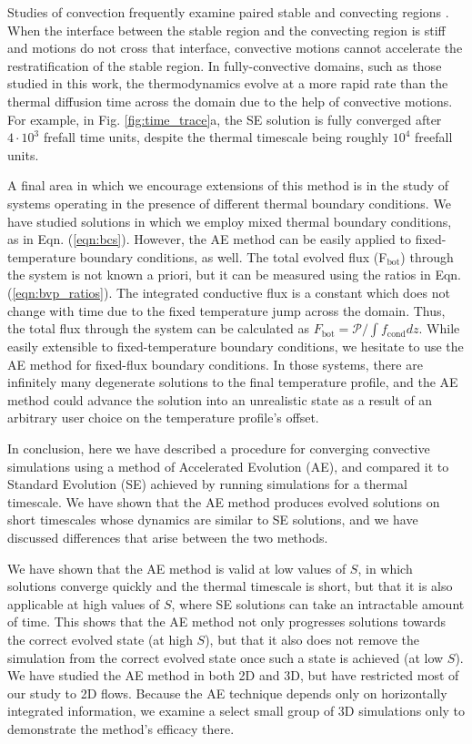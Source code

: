 \documentclass[aps, pre, onecolumn, nofootinbib, notitlepage, groupedaddress, amsfonts, amssymb, amsmath, longbibliography]{revtex4-1}
\begin{document}
Studies of convection frequently examine paired stable and convecting regions
\cite{hurlburt&all1986, brandenburg&all2005, couston&all2017}.
When the interface between the stable region
and the convecting region is stiff and motions do not cross that interface,
convective motions cannot accelerate the restratification of the stable region.
In fully-convective domains, such as those studied in this work, the thermodynamics evolve
at a more rapid rate than the thermal diffusion time across the domain due to
the help of convective motions.  For example, in Fig. \ref{fig:time_trace}a,
the SE solution is fully converged after $4\cdot 10^3$ frefall time units,
despite the thermal timescale being roughly $10^4$ freefall units.

A final area in which we encourage extensions of this method is in the study of systems
operating in the presence of different thermal boundary conditions.
We have studied solutions in which we employ mixed thermal boundary conditions,
as in Eqn. (\ref{eqn:bcs}). However, the AE method can be easily applied to fixed-temperature
boundary conditions, as well.  The total evolved flux (F$_{\text{bot}}$)
through the system is not known a priori, but it can be measured using the ratios in
Eqn. (\ref{eqn:bvp_ratios}).  The integrated conductive flux is a constant which
does not change with time due to the fixed temperature jump across the domain.  
Thus, the total flux through the system can be calculated as 
$F_{\text{bot}} = \mathcal{P} / \int f_{\text{cond}} dz$. While easily extensible
to fixed-temperature boundary conditions, we hesitate to use the AE method for 
fixed-flux boundary conditions.  In those systems, there are infinitely many degenerate
solutions to the final temperature profile, and the AE method could advance the
solution into an unrealistic state as a result of an arbitrary user choice on the
temperature profile's offset.

In conclusion, here we have described a procedure for converging convective simulations using
a method of Accelerated Evolution (AE), and compared it to Standard
Evolution (SE) achieved by running simulations for a thermal timescale.
We have shown that the AE method produces evolved solutions on short timescales
whose dynamics are similar to SE solutions, and we have discussed differences that arise
between the two methods.

We have shown that the AE method is valid at low values of $S$, in which solutions
converge quickly and the thermal timescale is short, but that it is also applicable
at high values of $S$, where SE solutions can take an
intractable amount of time. This shows that the AE method not only progresses
solutions towards the correct evolved state (at high $S$), but that it also does not
remove the simulation from the correct evolved state once such a state is achieved (at low $S$). 
We have studied
the AE method in both 2D and 3D, but have restricted most of our study to 2D flows.
Because the AE technique depends only on horizontally integrated information, 
we examine a select small group
of 3D simulations only to demonstrate the method's efficacy there.
\end{document}
